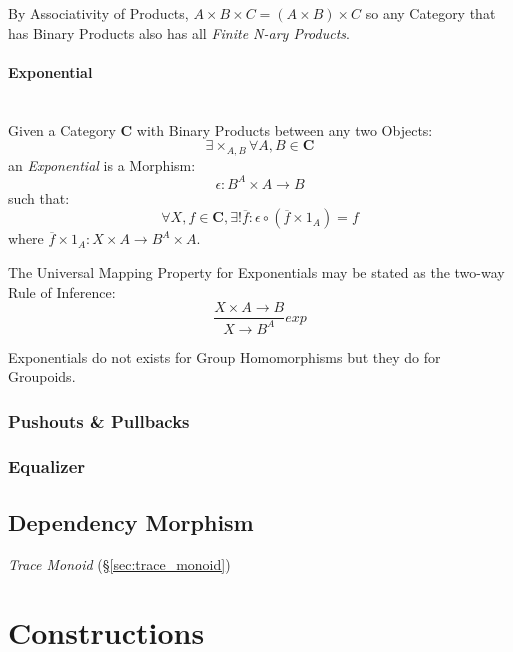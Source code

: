 By Associativity of Products, $A \times B \times C = (A \times B)
\times C$ so any Category that has Binary Products also has all
\emph{Finite N-ary Products}.

\paragraph{Exponential}\label{sec:category_exponential}
\hfill \\
Given a Category $\mathbf{C}$ with Binary Products between any two
Objects:
\[
    \exists \times_{A,B} \forall A,B \in \mathbf{C}
\]
an \emph{Exponential} is a Morphism:
\[
    \epsilon : B^A \times A \rightarrow B
\]
such that:
\[
    \forall X, f \in \mathbf{C}, \exists ! \overline{f} :
    \epsilon \circ (\overline{f} \times 1_A) = f
\]
where $\overline{f} \times 1_A : X \times A \rightarrow B^A \times A$.

The Universal Mapping Property for Exponentials may be stated as the
two-way Rule of Inference: %
\[
    {
        \frac{X \times A \rightarrow B}
        {X \rightarrow B^A}
    }exp
\]

Exponentials do not exists for Group Homomorphisms but they do for
Groupoids.



\subsubsection{Pushouts \& Pullbacks}\label{sec:category_pullback}



\subsubsection{Equalizer}\label{sec:limit_equalizer}



\subsection{Dependency Morphism}\label{sec:dependency_morphism}

\emph{Trace Monoid} (\S\ref{sec:trace_monoid})



\section{Constructions}\label{sec:category_construction}

